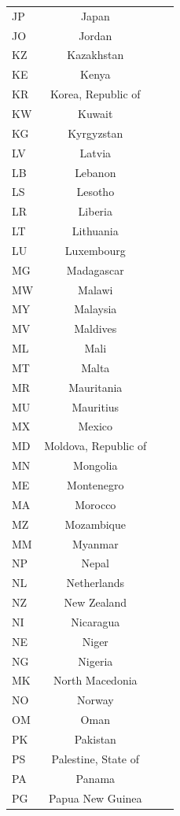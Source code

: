 \documentclass[12pt,a4paper]{article}
\begin{document}
\begin{flushleft}
\begin{longtable}{lccc}
JP & Japan &  &  \\
JO & Jordan &  &  \\
KZ & Kazakhstan &  &  \\
KE & Kenya &  &  \\
KR & Korea, Republic of &  &  \\
KW & Kuwait &  &  \\
KG & Kyrgyzstan &  &  \\
LV & Latvia &  &  \\
LB & Lebanon &  &  \\
LS & Lesotho &  &  \\
LR & Liberia &  &  \\
LT & Lithuania &  &  \\
LU & Luxembourg &  &  \\
MG & Madagascar &  &  \\
MW & Malawi &  &  \\
MY & Malaysia &  &  \\
MV & Maldives &  &  \\
ML & Mali &  &  \\
MT & Malta &  &  \\
MR & Mauritania &  &  \\
MU & Mauritius &  &  \\
MX & Mexico &  &  \\
MD & Moldova, Republic of &  &  \\
MN & Mongolia &  &  \\
ME & Montenegro &  &  \\
MA & Morocco &  &  \\
MZ & Mozambique &  &  \\
MM & Myanmar &  &  \\
NP & Nepal &  &  \\
NL & Netherlands &  &  \\
NZ & New Zealand &  &  \\
NI & Nicaragua &  &  \\
NE & Niger &  &  \\
NG & Nigeria &  &  \\
MK & North Macedonia &  &  \\
NO & Norway &  &  \\
OM & Oman &  &  \\
PK & Pakistan &  &  \\
PS & Palestine, State of &  &  \\
PA & Panama &  &  \\
PG & Papua New Guinea &  &  \\

\end{longtable}
\end{flushleft}
\end{document}
